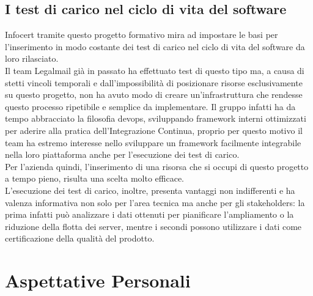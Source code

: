 \subsection{I test di carico nel ciclo di vita del software}
Infocert tramite questo progetto formativo mira ad impostare le basi per l'inserimento in modo costante dei test di carico nel ciclo di vita del software da loro rilasciato. \\
Il team Legalmail già in passato ha effettuato test di questo tipo ma, a causa di stetti vincoli temporali e dall'impossibilità di posizionare risorse esclusivamente su questo progetto, non ha avuto modo di creare un'infrastruttura che rendesse questo processo ripetibile e semplice da implementare.  
Il gruppo infatti ha da tempo abbracciato la filosofia \gls{devops}, sviluppando \gls{framework} interni ottimizzati per aderire alla pratica dell'Integrazione Continua, proprio per questo motivo il team ha estremo interesse nello sviluppare un framework facilmente integrabile nella loro piattaforma anche per l'esecuzione dei test di carico. \\
Per l'azienda quindi, l'inserimento di una risorsa che si occupi di questo progetto a tempo pieno, risulta una scelta molto efficace. \\
L'esecuzione dei test di carico, inoltre, presenta vantaggi non indifferenti e ha valenza informativa non solo per l'area tecnica ma anche per gli \gls{stakeholders}: la prima infatti può analizzare i dati ottenuti per pianificare l'ampliamento o la riduzione della flotta dei server, mentre i secondi possono utilizzare i dati come certificazione della qualità del prodotto.


\section{Aspettative Personali}
